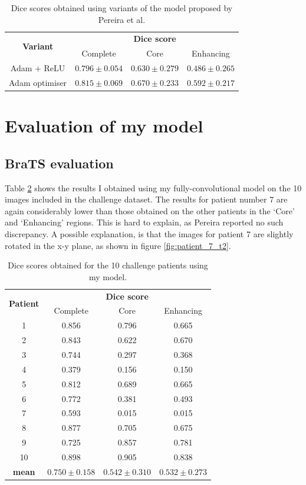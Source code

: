 \documentclass[12pt,a4paper,twoside,openright]{report}
\begin{document}
\begin{table}
\centering	
\begin{tabular}{ c | c c c} 
\multirow{2}{*}{\textbf{Variant}} & \multicolumn{3}{c}{\textbf{Dice score}} \\
 & Complete & Core & Enhancing \\
 \hline
Adam + ReLU & $0.796 \pm 0.054$ & $0.630 \pm 0.279$ & $0.486 \pm 0.265$ \\
Adam optimiser & $0.815 \pm 0.069$ & $0.670 \pm 0.233$ & $0.592 \pm 0.217$ \\
\end{tabular}
\caption{Dice scores obtained using variants of the model proposed by Pereira et al.}
\label{table:variants_dice_results}
\end{table}


\section{Evaluation of my model}
\subsection{BraTS evaluation}
Table \ref{table:my_model_dice_results} shows the results I obtained using my fully-convolutional model on the 10 images included in the challenge dataset. The results for patient number 7 are again considerably lower than those obtained on the other patients in the `Core' and `Enhancing' regions. This is hard to explain, as Pereira reported no such discrepancy. A possible explanation, is that the images for patient 7 are slightly rotated in the x-y plane, as shown in figure \ref{fig:patient_7_t2}.

\begin{table}
\centering	
\begin{tabular}{ c | c c c} 
\multirow{2}{*}{\textbf{Patient}} & \multicolumn{3}{c}{\textbf{Dice score}} \\
 & Complete & Core & Enhancing \\
 \hline
1 & 0.856 & 0.796 & 0.665 \\
2 & 0.843 & 0.622 & 0.670 \\
3 & 0.744 & 0.297 & 0.368 \\
4 & 0.379 & 0.156 & 0.150 \\
5 & 0.812 & 0.689 & 0.665 \\
6 & 0.772 & 0.381 & 0.493 \\
7 & 0.593 & 0.015 & 0.015 \\
8 & 0.877 & 0.705 & 0.675 \\
9 & 0.725 & 0.857 & 0.781 \\
10 & 0.898 & 0.905 & 0.838 \\
\textbf{mean} & $0.750 \pm 0.158$ & $0.542 \pm 0.310$ & $0.532 \pm 0.273$
\end{tabular}
\caption{Dice scores obtained for the 10 challenge patients using my model.}
\label{table:my_model_dice_results}
\end{table}
\end{document}

